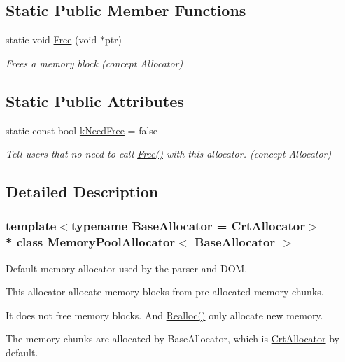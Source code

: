 \subsection*{Static Public Member Functions}
\begin{DoxyCompactItemize}
\item 
static void \hyperlink{classMemoryPoolAllocator_a6b180eb150451b4df8b70d827cd1191c}{Free} (void $\ast$ptr)
\begin{DoxyCompactList}\small\item\em Frees a memory block (concept Allocator) \end{DoxyCompactList}\end{DoxyCompactItemize}
\subsection*{Static Public Attributes}
\begin{DoxyCompactItemize}
\item 
static const bool \hyperlink{classMemoryPoolAllocator_ab4c7c5c631e451689bc9da392a65194f}{k\+Need\+Free} = false
\begin{DoxyCompactList}\small\item\em Tell users that no need to call \hyperlink{classMemoryPoolAllocator_a6b180eb150451b4df8b70d827cd1191c}{Free()} with this allocator. (concept Allocator) \end{DoxyCompactList}\end{DoxyCompactItemize}


\subsection{Detailed Description}
\subsubsection*{template$<$typename Base\+Allocator = Crt\+Allocator$>$\\*
class Memory\+Pool\+Allocator$<$ Base\+Allocator $>$}

Default memory allocator used by the parser and D\+OM. 

This allocator allocate memory blocks from pre-\/allocated memory chunks.

It does not free memory blocks. And \hyperlink{classMemoryPoolAllocator_aba75280d42184b0ad414243f7f5ac6c7}{Realloc()} only allocate new memory.

The memory chunks are allocated by Base\+Allocator, which is \hyperlink{classCrtAllocator}{Crt\+Allocator} by default.


